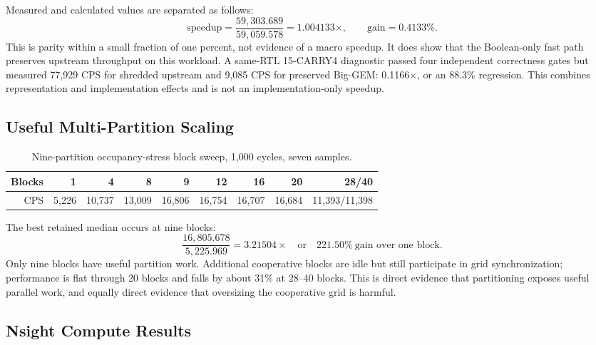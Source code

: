 \documentclass[11pt,a4paper]{article}
\begin{document}
Measured and calculated values are separated as follows:
\[
 \mathrm{speedup}=\frac{59{,}303.689}{59{,}059.578}=1.004133\times,
 \qquad
 \mathrm{gain}=0.4133\%.
\]
This is parity within a small fraction of one percent, not evidence of a macro
speedup.  It does show that the Boolean-only fast path preserves upstream
throughput on this workload.  A same-RTL 15-CARRY4 diagnostic passed four
independent correctness gates but measured 77,929 CPS for shredded upstream and
9,085 CPS for preserved Big-GEM: 0.1166$\times$, or an 88.3\% regression.
This combines representation and implementation effects and is not an
implementation-only speedup.

\subsection{Useful Multi-Partition Scaling}

\begin{table}[H]
\centering
\caption{Nine-partition occupancy-stress block sweep, 1,000 cycles, seven samples.}
\begin{tabular}{rrrrrrrrr}
\toprule
Blocks & 1 & 4 & 8 & 9 & 12 & 16 & 20 & 28/40 \\
\midrule
CPS & 5,226 & 10,737 & 13,009 & 16,806 & 16,754 & 16,707 & 16,684 & 11,393/11,398 \\
\bottomrule
\end{tabular}
\end{table}

The best retained median occurs at nine blocks:
\[
 \frac{16{,}805.678}{5{,}225.969}=3.21504\times
 \quad\text{or}\quad 221.50\%\ \text{gain over one block}.
\]
Only nine blocks have useful partition work.  Additional cooperative blocks are
idle but still participate in grid synchronization; performance is flat through
20 blocks and falls by about 31\% at 28--40 blocks.  This is direct evidence that
partitioning exposes useful parallel work, and equally direct evidence that
oversizing the cooperative grid is harmful.

\subsection{Nsight Compute Results}

\begin{table}[H]
\centering
\caption{Current production-kernel Nsight Compute counters.}
\scriptsize
{}
\end{table}
\end{document}
